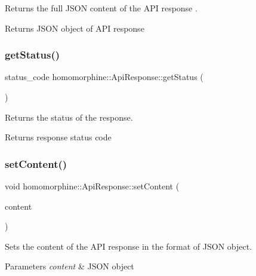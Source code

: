 Returns the full J\+S\+ON content of the A\+PI response .

\begin{DoxyReturn}{Returns}
J\+S\+ON object of A\+PI response 
\end{DoxyReturn}
\mbox{\label{classhomomorphine_1_1_api_response_abe5d8dbece3cffee08905bb9389a8fd0}} 
\subsubsection{\texorpdfstring{get\+Status()}{getStatus()}}
{\footnotesize\ttfamily status\+\_\+code homomorphine\+::\+Api\+Response\+::get\+Status (\begin{DoxyParamCaption}{ }\end{DoxyParamCaption})}

Returns the status of the response.

\begin{DoxyReturn}{Returns}
response status code 
\end{DoxyReturn}
\mbox{\label{classhomomorphine_1_1_api_response_aee304405cacc0b976145d2a3465ea7e5}} 
\subsubsection{\texorpdfstring{set\+Content()}{setContent()}}
{\footnotesize\ttfamily void homomorphine\+::\+Api\+Response\+::set\+Content (\begin{DoxyParamCaption}\item[{json\+::value \&}]{content }\end{DoxyParamCaption})}

Sets the content of the A\+PI response in the format of J\+S\+ON object.


\begin{DoxyParams}{Parameters}
{\em content} & J\+S\+ON object \\
\hline
\end{DoxyParams}
\mbox{\label{classhomomorphine_1_1_api_response_a3823ad464f6011397be80c62e391171c}} 
